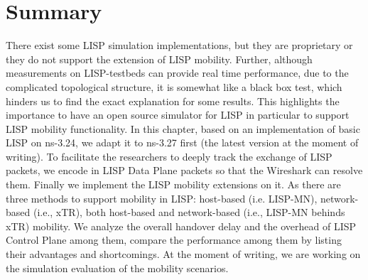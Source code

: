 \section{Summary}
\label{sec:ns3_conclusion}
There exist some LISP simulation implementations, but they are proprietary or they do not support the extension of LISP mobility. Further, although measurements on LISP-testbeds can provide real time performance, due to the complicated topological structure, it is somewhat like a black box test, which hinders us to find the exact explanation for some results. This highlights the importance to have an open source simulator for LISP in particular to support LISP mobility functionality. In this chapter, based on an implementation of basic LISP on ns-3.24, we adapt it to ns-3.27 first (the latest version at the moment of writing). To facilitate the researchers to deeply track the exchange of LISP packets, we encode in LISP Data Plane packets so that the Wireshark can resolve them. Finally we implement the LISP mobility extensions on it. As there are three methods to support mobility in LISP: host-based (i.e. LISP-MN), network-based (i.e., xTR), both host-based and network-based (i.e., LISP-MN behinds xTR) mobility. We analyze the overall handover delay and the overhead of LISP Control Plane among them, compare the performance among them by listing their advantages and shortcomings. At the moment of writing, we are working on the simulation evaluation of the mobility scenarios. %



